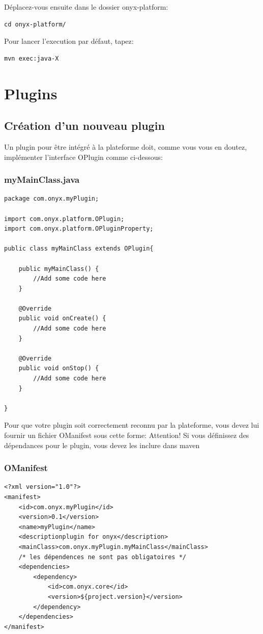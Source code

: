Déplacez-vous ensuite dans le dossier onyx-platform:
\begin{verbatim}
cd onyx-platform/
\end{verbatim}

Pour lancer l'execution par défaut, tapez:
\begin{verbatim}
mvn exec:java-X
\end{verbatim}

\newpage
\section{Plugins}

\subsection{Création d'un nouveau plugin}

Un plugin pour être intégré à la plateforme doit, comme vous vous en doutez, implémenter l'interface OPlugin comme ci-dessous:
\subsubsection{myMainClass.java}
\begin{verbatim}
package com.onyx.myPlugin;

import com.onyx.platform.OPlugin;
import com.onyx.platform.OPluginProperty;

public class myMainClass extends OPlugin{

    public myMainClass() {
        //Add some code here
    }

    @Override
    public void onCreate() {
        //Add some code here
    }

    @Override
    public void onStop() {
        //Add some code here
    }

}
\end{verbatim}

Pour que votre plugin soit correctement reconnu par la plateforme, vous devez lui fournir un fichier OManifest sous cette forme:
Attention! Si vous définissez des dépendances pour le plugin, vous devez les inclure dans maven
\subsubsection{OManifest}
\begin{verbatim}
<?xml version="1.0"?>
<manifest>
    <id>com.onyx.myPlugin</id>
    <version>0.1</version>
    <name>myPlugin</name>
    <descriptionplugin for onyx</description>
    <mainClass>com.onyx.myPlugin.myMainClass</mainClass>
    /* les dépendences ne sont pas obligatoires */
    <dependencies>
        <dependency>
            <id>com.onyx.core</id>
            <version>${project.version}</version>
        </dependency>
    </dependencies>
</manifest>
\end{verbatim}

